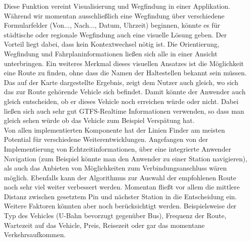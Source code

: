       Diese Funktion vereint Visualisierung und Wegfindung in einer Applikation. Während wir momentan ausschließlich eine Wegfindung über verschiedene Formularfelder (Von..., Nach..., Datum, Uhrzeit) beginnen, könnte es für städtische oder regionale Wegfindung auch eine visuelle Lösung geben. Der Vorteil liegt dabei, dass kein Kontextwechsel nötig ist. Die Orientierung, Wegfindung und Fahrplaninformationen ließen sich alle in einer Ansicht unterbringen. Ein weiteres Merkmal dieses visuellen Ansatzes ist die Möglichkeit eine Route zu finden, ohne dass die Namen der Haltestellen bekannt sein müssen. Das auf der Karte dargestellte Ergebnis, zeigt dem Nutzer auch gleich, wo sich das zur Route gehörende Vehicle sich befindet. Damit könnte der Anwender auch gleich entscheiden, ob er dieses Vehicle noch erreichen würde oder nicht. Dabei ließen sich auch sehr gut GTFS-Realtime Informationen verwenden, so dass man gleich sehen würde ob das Vehicle zum Beispiel Verspätung hat.\\

      Von allen implementierten Komponente hat der Linien Finder am meisten Potential für verschiedene Weiterentwicklungen. Angefangen von der Implementierung von Echtzeitinformationen, über eine integrierte Anwender Navigation (zum Beispiel könnte man den Anwender zu einer Station navigieren), als auch das Anbieten von Möglichkeiten zum Verbindungsanschluss wären möglich. Ebenfalls kann der Algorithmus zur Auswahl der empfohlenen Route noch sehr viel weiter verbessert werden. Momentan fließt vor allem die mittlere Distanz zwischen gesetztem Pin und nächster Station in die Entscheidung ein. Weitere Faktoren könnten aber noch berücksichtigt werden. Beispielsweise der Typ des Vehicles (U-Bahn bevorzugt gegenüber Bus), Frequenz der Route, Wartezeit auf das Vehicle, Preis, Reisezeit oder gar das momentane Verkehrsaufkommen.
      
    

    

